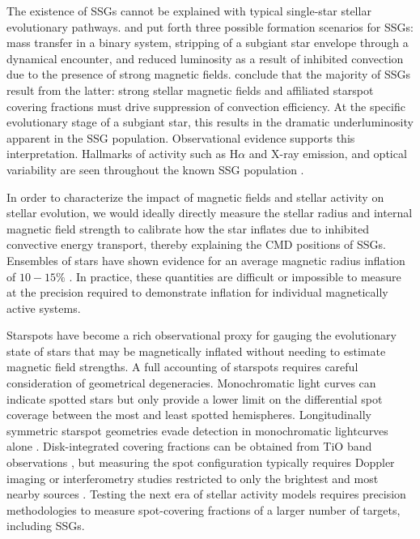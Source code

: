 \documentclass[trackchanges]{aastex631}
\begin{document}
The existence of SSGs cannot be explained with typical single-star stellar evolutionary pathways. \citet{geller17} and \citet{leiner17} put forth three possible formation scenarios for SSGs: mass transfer in a binary system, stripping of a subgiant star envelope through a dynamical encounter, and reduced luminosity as a result of inhibited convection due to the presence of strong magnetic fields. \citet{leiner17} conclude that the majority of SSGs result from the latter: strong stellar magnetic fields and affiliated starspot covering fractions must drive suppression of convection efficiency. At the specific evolutionary stage of a subgiant star, this results in the dramatic underluminosity apparent in the SSG population. Observational evidence supports this interpretation.  Hallmarks of activity such as  H$\alpha$ and X-ray emission, and optical variability are seen throughout the known SSG population \citep{geller17}.

In order to characterize the impact of magnetic fields and stellar activity on stellar evolution, we would ideally directly measure the stellar radius and internal magnetic field strength to calibrate how the star inflates due to inhibited convective energy transport, thereby explaining the CMD positions of SSGs.  Ensembles of stars have shown evidence for an average magnetic radius inflation of $10-15\%$ \citep{2018AJ....155..225K,2018MNRAS.476.3245J}. In practice, these quantities are difficult or impossible to measure at the precision required to demonstrate inflation for individual magnetically active systems.



Starspots have become a rich observational proxy for gauging the evolutionary state of stars that may be magnetically inflated without needing to estimate magnetic field strengths.  A full accounting of starspots requires careful consideration of geometrical degeneracies.  Monochromatic light curves can indicate spotted stars \citep{2014ApJS..211...24M} but only provide a lower limit on the differential spot coverage between the most and least spotted hemispheres. Longitudinally symmetric starspot geometries evade detection in monochromatic lightcurves alone \citep{2019AJ....157...64L}. Disk-integrated covering fractions can be obtained from TiO band observations \citep{oneal96,fang2016,2019AJ....158..101M}, but measuring the spot configuration typically requires Doppler imaging or interferometry studies restricted to only the brightest and most nearby sources \citep{roettenbacher16}.  Testing the next era of stellar activity models requires precision methodologies to measure spot-covering fractions of a larger number of targets, including SSGs.
\end{document}
